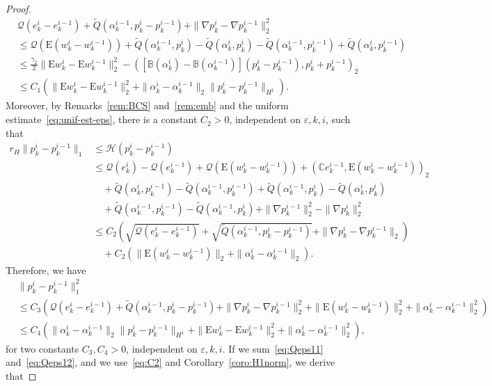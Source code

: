 \documentclass[reqno]{amsart}
\theoremstyle{definition}
\numberwithin{equation}{section}
\def\C {\mathbb C}
\def\B {\mathbb B}
\def\EE {\mathrm{E}}
\begin{document}
\begin{proof}
\begin{align}
&\mathcal Q(e_k^i-e_k^{i-1})+\tilde Q(\alpha_k^{i-1},p_k^i-p_k^{i-1})+\|\nabla p_k^i-\nabla p_k^{i-1}\|_2^2\nonumber\\
&\le \mathcal Q(\EE(w_k^i-w_k^{i-1}))+\tilde Q(\alpha_k^{i-1},p_k^i)-\tilde Q(\alpha_k^i,p_k^i)-\tilde Q(\alpha_k^{i-1},p_k^{i-1})+\tilde Q(\alpha_k^i,p_k^{i-1})\nonumber\\
&\le \frac{\gamma_2}{2}\|\EE w_k^i-\EE w_k^{i-1}\|_2^2-([\B(\alpha_k^i)-\B(\alpha_k^{i-1})](p_k^i-p_k^{i-1}),p_k^i+p_k^{i-1})_2\nonumber\\
&\le C_1\left(\|\EE w_k^i-\EE w_k^{i-1}\|_2^2+\|\alpha_k^i-\alpha_k^{i-1}\|_2\|p_k^i-p_k^{i-1}\|_{H^1}\right).\label{eq:Qeps11}
\end{align}
Moreover, by Remarks~\ref{rem:BCS} and~\ref{rem:emb} and the uniform estimate~\eqref{eq:unif-est-eps}, there is a constant $C_2>0$, independent on $\varepsilon,k,i$, such that
\begin{align*}
r_H\|p_k^i-p_k^{i-1}\|_1&\le \mathcal H(p_k^i-p_k^{i-1})\\
&\le \mathcal Q(e_k^i)-\mathcal Q(e_k^{i-1})+\mathcal Q(\EE(w_k^i-w_k^{i-1}))+(\C e_k^{i-1},\EE(w_k^i-w_k^{i-1}))_2\\
&\quad+\tilde Q(\alpha_k^i,p_k^{i-1})-\tilde Q(\alpha_k^{i-1},p_k^{i-1})+\tilde Q(\alpha_k^{i-1},p_k^i)-\tilde Q(\alpha_k^i,p_k^i)\\
&\quad+\tilde Q(\alpha_k^{i-1},p_k^{i-1})-\tilde Q(\alpha_k^{i-1},p_k^i)+\|\nabla p_k^{i-1}\|_2^2-\|\nabla p_k^i\|_2^2\\
&\le C_2\left(\sqrt{\mathcal Q(e_k^i-e_k^{i-1})}+\sqrt{\tilde Q(\alpha_k^{i-1},p_k^i-p_k^{i-1})}+\|\nabla p_k^i-\nabla p_k^{i-1}\|_2\right)\\
&\quad+C_2(\|\EE(w_k^i-w_k^{i-1})\|_2+\|\alpha_k^i-\alpha_k^{i-1}\|_2).
\end{align*}
Therefore, we have
\begin{align}
&\|p_k^i-p_k^{i-1}\|_1^2\nonumber\\
&\le C_3\left(\mathcal Q(e_k^i-e_k^{i-1})+\tilde Q(\alpha_k^{i-1},p_k^i-p_k^{i-1})+\|\nabla p_k^i-\nabla p_k^{i-1}\|_2^2+\|\EE(w_k^i-w_k^{i-1})\|_2^2+ \|\alpha_k^i-\alpha_k^{i-1}\|^2_2\right)\nonumber\\
&\le C_4(\|\alpha_k^i-\alpha_k^{i-1}\|_2\|p_k^i-p_k^{i-1}\|_{H^1}+\|\EE w_k^i-\EE w_k^{i-1}\|_2^2+\|\alpha_k^i-\alpha_k^{i-1}\|_2^2),\label{eq:Qeps12} 
\end{align}
for two constants $C_3,C_4>0$, independent on $\varepsilon,k,i$.  If we sum~\eqref{eq:Qeps11} and~\eqref{eq:Qeps12}, and we use~\eqref{eq:C2} and Corollary~\ref{coro:H1norm}, we derive that

\end{proof}
\end{document}
